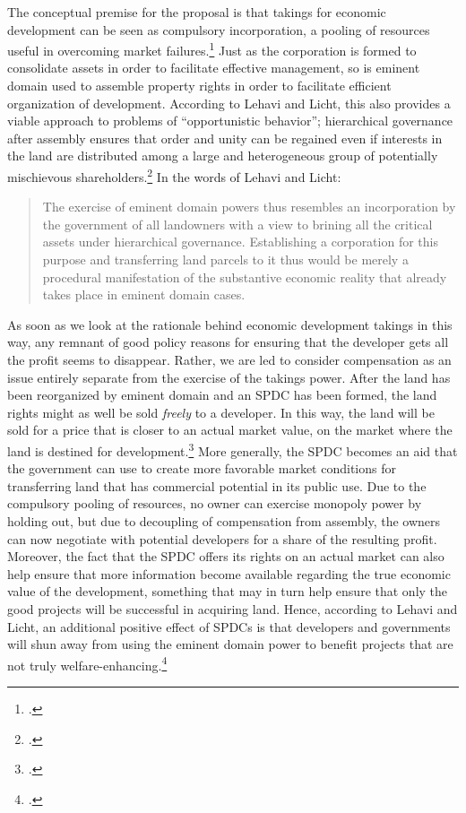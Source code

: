 \documentclass[12pt,a4paper]{book} %
\begin{document}
The conceptual premise for the proposal is that takings for economic development can be seen as compulsory incorporation, a pooling of resources useful in overcoming market failures.\footcite[1732-1733]{lehavi07} Just as the corporation is formed to consolidate assets in order to facilitate effective management, so is eminent domain used to assemble property rights in order to facilitate efficient organization of development. According to Lehavi and Licht, this also provides a viable approach to problems of ``opportunistic behavior''; hierarchical governance after assembly ensures that order and unity can be regained even if interests in the land are distributed among a large and heterogeneous group of potentially mischievous shareholders.\footcite[1733]{lehavi07} In the words of Lehavi and Licht:

\begin{quote}
The exercise of eminent domain powers thus resembles an incorporation by the government of all landowners with a view to brining all the critical assets under hierarchical governance. Establishing a corporation for this purpose and transferring land parcels to it thus would be merely a procedural manifestation of the substantive economic reality that already takes place in eminent domain cases.
\end{quote}

As soon as we look at the rationale behind economic development takings in this way, any remnant of good policy reasons for ensuring that the developer gets all the profit seems to disappear. Rather, we are led to consider compensation as an issue entirely separate from the exercise of the takings power. After the land has been reorganized by eminent domain and an SPDC has been formed, the land rights might as well be sold {\it freely} to a developer. In this way, the land will be sold for a price that is closer to an actual market value, on the market where the land is destined for development.\footcite[1735-1736]{lehavi07} More generally, the SPDC becomes an aid that the government can use to create more favorable market conditions for transferring land that has commercial potential in its public use. Due to the compulsory pooling of resources, no owner can exercise monopoly power by holding out, but due to decoupling of compensation from assembly, the owners can now negotiate with potential developers for a share of the resulting profit. Moreover, the fact that the SPDC offers its rights on an actual market can also help ensure that more information become available regarding the true economic value of the development, something that may in turn help ensure that only the good projects will be successful in acquiring land. Hence, according to Lehavi and Licht, an additional positive effect of SPDCs is that developers and governments will shun away from using the eminent domain power to benefit projects that are not truly welfare-enhancing.\footcite[1735-1736]{lehavi07}
\end{document}
